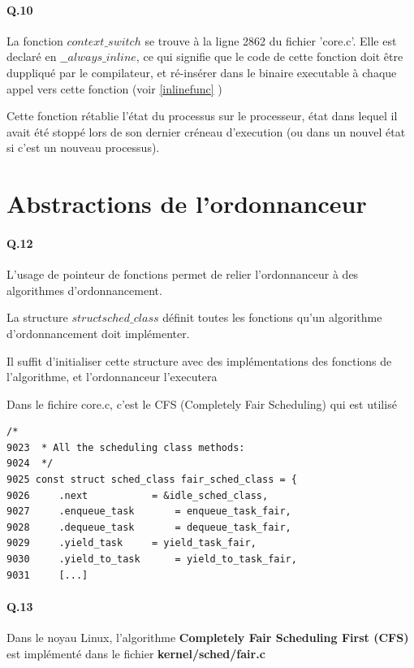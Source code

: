 \documentclass[10pt]{article}
\begin{document}
 \paragraph{Q.10}
 La fonction $context\_switch$ se trouve à la ligne 2862 du fichier 'core.c'.
 Elle est declaré en $\_\_always\_inline$, ce qui signifie que le code de cette fonction doit être duppliqué par le compilateur,
 et ré-insérer dans le binaire executable à chaque appel vers cette fonction (voir \ref{inlinefunc} )
 
 Cette fonction rétablie l'état du processus sur le processeur, état dans lequel il avait été stoppé lors de son dernier créneau d'execution (ou dans un nouvel état si c'est un nouveau processus).

\newpage
\section{Abstractions de l'ordonnanceur}
 \paragraph{Q.12}
 L'usage de pointeur de fonctions permet de relier l'ordonnanceur à des algorithmes d'ordonnancement.
 
 La structure $struct sched\_class$ définit toutes les fonctions qu'un algorithme d'ordonnancement doit implémenter.
 
 Il suffit d'initialiser cette structure avec des implémentations des fonctions de l'algorithme, et l'ordonnanceur l'executera

 Dans le fichire core.c, c'est le CFS (Completely Fair Scheduling) qui est utilisé

\lstset{language=C}
\begin{lstlisting}[frame=single]
      /*
9023  * All the scheduling class methods:
9024  */ 
9025 const struct sched_class fair_sched_class = {
9026     .next           = &idle_sched_class,
9027     .enqueue_task       = enqueue_task_fair,
9028     .dequeue_task       = dequeue_task_fair,
9029     .yield_task     = yield_task_fair,
9030     .yield_to_task      = yield_to_task_fair,
9031     [...] 
\end{lstlisting}

  \paragraph{Q.13}
  Dans le noyau Linux, l'algorithme \textbf{Completely Fair Scheduling First (CFS)} est implémenté dans le fichier \textbf{kernel/sched/fair.c}
\end{document}
